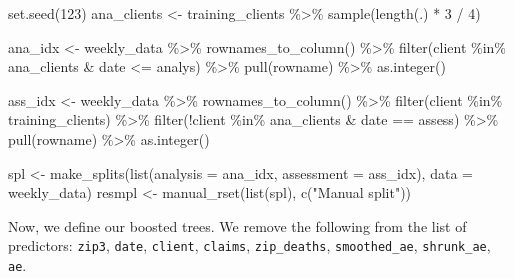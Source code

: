 \documentclass[
]{article}
\newenvironment{Shaded}{\begin{snugshade}}{\end{snugshade}}
\newcommand{\AttributeTok}[1]{\textcolor[rgb]{0.77,0.63,0.00}{#1}}
\newcommand{\DecValTok}[1]{\textcolor[rgb]{0.00,0.00,0.81}{#1}}
\newcommand{\FunctionTok}[1]{\textcolor[rgb]{0.00,0.00,0.00}{#1}}
\newcommand{\NormalTok}[1]{#1}
\newcommand{\OtherTok}[1]{\textcolor[rgb]{0.56,0.35,0.01}{#1}}
\newcommand{\SpecialCharTok}[1]{\textcolor[rgb]{0.00,0.00,0.00}{#1}}
\newcommand{\StringTok}[1]{\textcolor[rgb]{0.31,0.60,0.02}{#1}}
\begin{document}
\begin{Shaded}
\begin{Highlighting}[]
\FunctionTok{set.seed}\NormalTok{(}\DecValTok{123}\NormalTok{)}
\NormalTok{ana\_clients }\OtherTok{\textless{}{-}}
\NormalTok{  training\_clients }\SpecialCharTok{\%\textgreater{}\%}
  \FunctionTok{sample}\NormalTok{(}\FunctionTok{length}\NormalTok{(.) }\SpecialCharTok{*} \DecValTok{3} \SpecialCharTok{/} \DecValTok{4}\NormalTok{)}

\NormalTok{ana\_idx }\OtherTok{\textless{}{-}}
\NormalTok{  weekly\_data }\SpecialCharTok{\%\textgreater{}\%}
  \FunctionTok{rownames\_to\_column}\NormalTok{() }\SpecialCharTok{\%\textgreater{}\%}
  \FunctionTok{filter}\NormalTok{(client }\SpecialCharTok{\%in\%}\NormalTok{ ana\_clients }\SpecialCharTok{\&}\NormalTok{ date }\SpecialCharTok{\textless{}=}\NormalTok{ analys) }\SpecialCharTok{\%\textgreater{}\%}
  \FunctionTok{pull}\NormalTok{(rowname) }\SpecialCharTok{\%\textgreater{}\%}
  \FunctionTok{as.integer}\NormalTok{()}

\NormalTok{ass\_idx }\OtherTok{\textless{}{-}}
\NormalTok{  weekly\_data }\SpecialCharTok{\%\textgreater{}\%}
  \FunctionTok{rownames\_to\_column}\NormalTok{() }\SpecialCharTok{\%\textgreater{}\%}
  \FunctionTok{filter}\NormalTok{(client }\SpecialCharTok{\%in\%}\NormalTok{ training\_clients) }\SpecialCharTok{\%\textgreater{}\%}
  \FunctionTok{filter}\NormalTok{(}\SpecialCharTok{!}\NormalTok{client }\SpecialCharTok{\%in\%}\NormalTok{ ana\_clients }\SpecialCharTok{\&}\NormalTok{ date }\SpecialCharTok{==}\NormalTok{ assess) }\SpecialCharTok{\%\textgreater{}\%}
  \FunctionTok{pull}\NormalTok{(rowname) }\SpecialCharTok{\%\textgreater{}\%}
  \FunctionTok{as.integer}\NormalTok{()}

\NormalTok{spl }\OtherTok{\textless{}{-}} \FunctionTok{make\_splits}\NormalTok{(}\FunctionTok{list}\NormalTok{(}\AttributeTok{analysis =}\NormalTok{ ana\_idx, }\AttributeTok{assessment =}\NormalTok{ ass\_idx), }\AttributeTok{data =}\NormalTok{ weekly\_data)}
\NormalTok{resmpl }\OtherTok{\textless{}{-}} \FunctionTok{manual\_rset}\NormalTok{(}\FunctionTok{list}\NormalTok{(spl), }\FunctionTok{c}\NormalTok{(}\StringTok{"Manual split"}\NormalTok{))}
\end{Highlighting}
\end{Shaded}

Now, we define our boosted trees. We remove the following from the list
of predictors: \texttt{zip3}, \texttt{date}, \texttt{client},
\texttt{claims}, \texttt{zip\_deaths}, \texttt{smoothed\_ae},
\texttt{shrunk\_ae}, \texttt{ae}.
\end{document}
